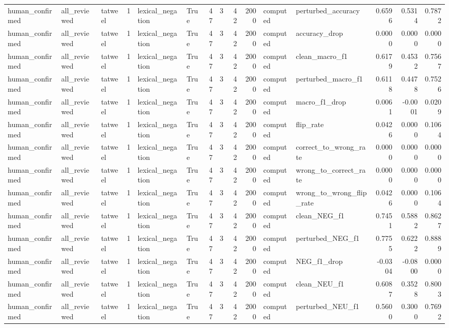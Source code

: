 \begin{tabular}{lllrllrrrrllrrr}
human_confirmed & all_reviewed & tatweel & 1 & lexical_negation & True & 47 & 3 & 42 & 2000 & computed & perturbed_accuracy & 0.6596 & 0.5314 & 0.7872 \\
human_confirmed & all_reviewed & tatweel & 1 & lexical_negation & True & 47 & 3 & 42 & 2000 & computed & accuracy_drop & 0.0000 & 0.0000 & 0.0000 \\
human_confirmed & all_reviewed & tatweel & 1 & lexical_negation & True & 47 & 3 & 42 & 2000 & computed & clean_macro_f1 & 0.6179 & 0.4532 & 0.7567 \\
human_confirmed & all_reviewed & tatweel & 1 & lexical_negation & True & 47 & 3 & 42 & 2000 & computed & perturbed_macro_f1 & 0.6118 & 0.4478 & 0.7526 \\
human_confirmed & all_reviewed & tatweel & 1 & lexical_negation & True & 47 & 3 & 42 & 2000 & computed & macro_f1_drop & 0.0061 & -0.0001 & 0.0209 \\
human_confirmed & all_reviewed & tatweel & 1 & lexical_negation & True & 47 & 3 & 42 & 2000 & computed & flip_rate & 0.0426 & 0.0000 & 0.1064 \\
human_confirmed & all_reviewed & tatweel & 1 & lexical_negation & True & 47 & 3 & 42 & 2000 & computed & correct_to_wrong_rate & 0.0000 & 0.0000 & 0.0000 \\
human_confirmed & all_reviewed & tatweel & 1 & lexical_negation & True & 47 & 3 & 42 & 2000 & computed & wrong_to_correct_rate & 0.0000 & 0.0000 & 0.0000 \\
human_confirmed & all_reviewed & tatweel & 1 & lexical_negation & True & 47 & 3 & 42 & 2000 & computed & wrong_to_wrong_flip_rate & 0.0426 & 0.0000 & 0.1064 \\
human_confirmed & all_reviewed & tatweel & 1 & lexical_negation & True & 47 & 3 & 42 & 2000 & computed & clean_NEG_f1 & 0.7451 & 0.5882 & 0.8627 \\
human_confirmed & all_reviewed & tatweel & 1 & lexical_negation & True & 47 & 3 & 42 & 2000 & computed & perturbed_NEG_f1 & 0.7755 & 0.6222 & 0.8889 \\
human_confirmed & all_reviewed & tatweel & 1 & lexical_negation & True & 47 & 3 & 42 & 2000 & computed & NEG_f1_drop & -0.0304 & -0.0800 & 0.0000 \\
human_confirmed & all_reviewed & tatweel & 1 & lexical_negation & True & 47 & 3 & 42 & 2000 & computed & clean_NEU_f1 & 0.6087 & 0.3528 & 0.8003 \\
human_confirmed & all_reviewed & tatweel & 1 & lexical_negation & True & 47 & 3 & 42 & 2000 & computed & perturbed_NEU_f1 & 0.5600 & 0.3000 & 0.7692 \\

\end{tabular}
